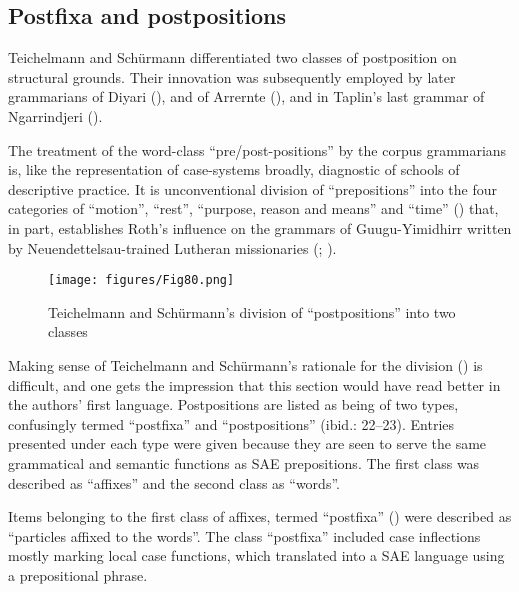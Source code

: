 \subsection{Postfixa and postpositions}
\label{sec:key:5.3.2}

Teichelmann and Schürmann differentiated two classes of postposition on structural grounds. Their innovation was subsequently employed by later grammarians of Diyari (), and of Arrernte (), and in Taplin’s last grammar of Ngarrindjeri (\citeyear[8]{taplin_grammar_1878}).


The treatment of the word-class “pre/post-positions” by the corpus grammarians is, like the representation of case-systems broadly, diagnostic of schools of descriptive practice. It is  unconventional division of “prepositions” into the four categories of ``motion'', ``rest'', ``purpose, reason and means'' and ``time'' () that, in part, establishes Roth’s influence on the grammars of Guugu-Yimidhirr written by Neuendettelsau-trained Lutheran missionaries (\citealt{schwarz_koko_1900}; ).

\begin{figure}[b]
\texttt{[image: figures/Fig80.png]}
\caption{\label{fig:5:80}Teichelmann and Schürmann’s division of “postpositions” into two classes \citeyearpar[21]{teichelmann_outlines_1840}}
\end{figure}


Making sense of Teichelmann and Schürmann’s rationale for the division () is difficult, and one gets the impression that this section would have read better in the authors' first language. Postpositions are listed as being of two types, confusingly termed “postfixa” \citep[21--22]{teichelmann_outlines_1840} and “postpositions” (ibid.: 22--23). Entries presented under each type were given because they are seen to serve the same grammatical and semantic functions as SAE prepositions. The first class was described as “affixes” and the second class as ``words''.



Items belonging to the first class of affixes, termed “postfixa” () were described as ``particles affixed to the words''. The class “postfixa” included case inflections mostly marking local case functions, which translated into a SAE language using a prepositional phrase.

